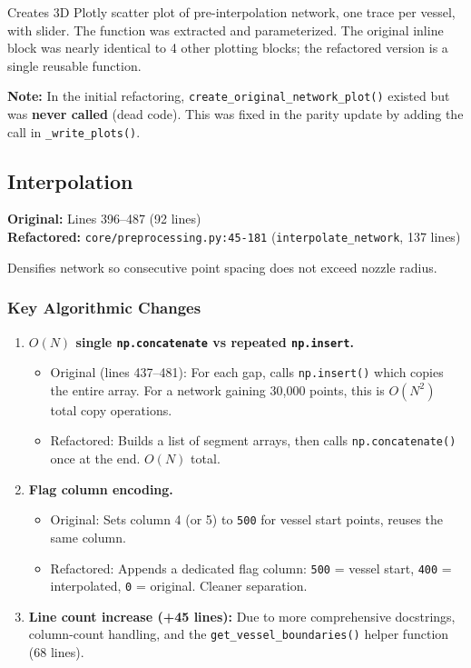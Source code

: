 \documentclass[11pt,letterpaper]{article}
\newcommand{\code}[1]{\texttt{#1}}
\begin{document}
Creates 3D Plotly scatter plot of pre-interpolation network, one trace per vessel, with slider. The function was extracted and parameterized. The original inline block was nearly identical to 4 other plotting blocks; the refactored version is a single reusable function.

\textbf{Note:} In the initial refactoring, \code{create\_original\_network\_plot()} existed but was \textbf{never called} (dead code). This was fixed in the parity update by adding the call in \code{\_write\_plots()}.

\subsection{Interpolation}

\textbf{Original:} Lines 396--487 (92 lines)\\
\textbf{Refactored:} \code{core/preprocessing.py:45-181} (\code{interpolate\_network}, 137 lines)

Densifies network so consecutive point spacing does not exceed nozzle radius.

\subsubsection{Key Algorithmic Changes}

\begin{enumerate}
    \item \textbf{$O(N)$ single \code{np.concatenate} vs repeated \code{np.insert}.}
    \begin{itemize}
        \item Original (lines 437--481): For each gap, calls \code{np.insert()} which copies the entire array. For a network gaining 30,000 points, this is $O(N^2)$ total copy operations.
        \item Refactored: Builds a list of segment arrays, then calls \code{np.concatenate()} once at the end. $O(N)$ total.
    \end{itemize}

    \item \textbf{Flag column encoding.}
    \begin{itemize}
        \item Original: Sets column 4 (or 5) to \code{500} for vessel start points, reuses the same column.
        \item Refactored: Appends a dedicated flag column: \code{500} = vessel start, \code{400} = interpolated, \code{0} = original. Cleaner separation.
    \end{itemize}

    \item \textbf{Line count increase (+45 lines):} Due to more comprehensive docstrings, column-count handling, and the \code{get\_vessel\_boundaries()} helper function (68 lines).
\end{enumerate}
\end{document}
